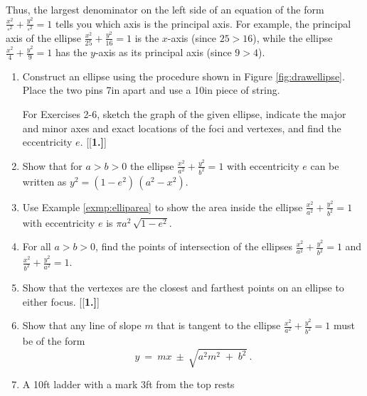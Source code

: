 Thus, the largest denominator on the left side of an equation
of the form $\frac{x^2}{\square^2} + \frac{y^2}{\square^2} = 1$ tells you which
axis is the principal axis. For example, the principal axis of the ellipse
$\frac{x^2}{25} + \frac{y^2}{16} = 1$ is the $x$-axis (since $25>16$), while the
ellipse $\frac{x^2}{4} + \frac{y^2}{9} = 1$ has the $y$-axis as its principal
axis (since $9>4$).
\newpage
\startexercises\label{sec7dot1}
{\small
{}
\begin{enumerate}[\bfseries 1.]
 \item Construct an ellipse using the procedure shown in Figure
  \ref{fig:drawellipse}. Place the two pins 7in apart and use a 10in piece of
  string.
\par\noindent For Exercises 2-6, sketch the graph of the given ellipse,
indicate the major and minor axes and exact locations of the foci and vertexes,
and find the eccentricity $e$.
[{[\bfseries 1.]}]
 \item Show that for $a>b>0$ the ellipse $\frac{x^2}{a^2} + \frac{y^2}{b^2} =1$
  with eccentricity $e$ can be written as $y^2 = (1-e^2)\,(a^2 - x^2)$.
 \item Use Example \ref{exmp:elliparea} to show the area inside the
  ellipse $\frac{x^2}{a^2} + \frac{y^2}{b^2} = 1$ with eccentricity $e$ is $\pi a^2\,\sqrt{1-e^2}$.
 \item For all $a>b>0$, find the points of intersection of the ellipses
  $\frac{x^2}{a^2} + \frac{y^2}{b^2} = 1$ and
  $\frac{x^2}{b^2} + \frac{y^2}{a^2} = 1$.
 \item Show that the vertexes are the closest and farthest points on an ellipse
  to either focus.
[{[\bfseries 1.]}]
 \item Show that any line of slope $m$ that is tangent to the ellipse
  $\frac{x^2}{a^2} + \frac{y^2}{b^2} = 1$ must be of the form
\[
y ~=~ mx ~\pm~ \sqrt{a^2 m^2 \;+\; b^2} ~.
\]
 \item\label{exer:ellipladder} A 10ft ladder with a mark 3ft from the top rests

\end{enumerate}}
